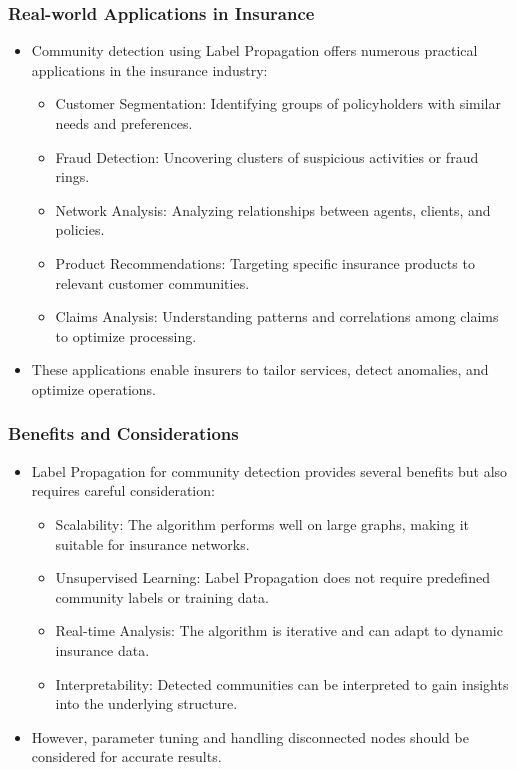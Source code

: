 \begin{frame}[fragile]\frametitle{Real-world Applications in Insurance}
\begin{itemize}
\item Community detection using Label Propagation offers numerous practical applications in the insurance industry:
\begin{itemize}
\item Customer Segmentation: Identifying groups of policyholders with similar needs and preferences.
\item Fraud Detection: Uncovering clusters of suspicious activities or fraud rings.
\item Network Analysis: Analyzing relationships between agents, clients, and policies.
\item Product Recommendations: Targeting specific insurance products to relevant customer communities.
\item Claims Analysis: Understanding patterns and correlations among claims to optimize processing.
\end{itemize}
\item These applications enable insurers to tailor services, detect anomalies, and optimize operations.
\end{itemize}
\end{frame}

\begin{frame}[fragile]\frametitle{Benefits and Considerations}
\begin{itemize}
\item Label Propagation for community detection provides several benefits but also requires careful consideration:
\begin{itemize}
\item Scalability: The algorithm performs well on large graphs, making it suitable for insurance networks.
\item Unsupervised Learning: Label Propagation does not require predefined community labels or training data.
\item Real-time Analysis: The algorithm is iterative and can adapt to dynamic insurance data.
\item Interpretability: Detected communities can be interpreted to gain insights into the underlying structure.
\end{itemize}
\item However, parameter tuning and handling disconnected nodes should be considered for accurate results.
\end{itemize}
\end{frame}

